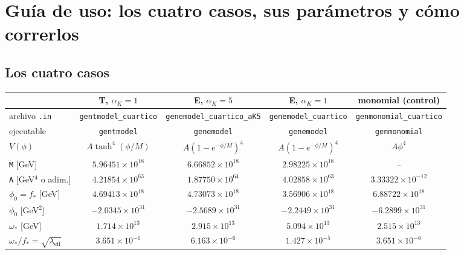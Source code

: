 \documentclass[11pt]{article}
\begin{document}
    \section{Guía de uso: los cuatro casos, sus parámetros y cómo correrlos}
        \label{sec:guia}

        \subsection{Los cuatro casos}

            \begin{table}[H]
                \centering
                \footnotesize
                \setlength{\tabcolsep}{3pt}
                \begin{tabular}{lcccc}
                    \toprule
                    & T, $\alpha_K = 1$ & E, $\alpha_K = 5$ & E, $\alpha_K = 1$ & monomial (control) \\
                    \midrule
                    archivo \texttt{.in} & \texttt{gentmodel\_cuartico} & \texttt{genemodel\_cuartico\_aK5} & \texttt{genemodel\_cuartico} & \texttt{genmonomial\_cuartico} \\
                    ejecutable & \texttt{gentmodel} & \texttt{genemodel} & \texttt{genemodel} & \texttt{genmonomial} \\
                    $V(\phi)$ & $A\tanh^4(\phi/M)$ & $A(1-e^{-\phi/M})^4$ & $A(1-e^{-\phi/M})^4$ & $A\phi^4$ \\
                    \texttt{M} [GeV] & $5.96451 \times 10^{18}$ & $6.66852 \times 10^{18}$ & $2.98225 \times 10^{18}$ & -- \\
                    \texttt{A} [GeV$^4$ o adim.] & $4.21854 \times 10^{63}$ & $1.87750 \times 10^{64}$ & $4.02858 \times 10^{63}$ & $3.33322 \times 10^{-12}$ \\
                    $\phi_0 = f_*$ [GeV] & $4.69413 \times 10^{18}$ & $4.73073 \times 10^{18}$ & $3.56906 \times 10^{18}$ & $6.88722 \times 10^{18}$ \\
                    $\dot\phi_0$ [GeV$^2$] & $-2.0345 \times 10^{31}$ & $-2.5689 \times 10^{31}$ & $-2.2449 \times 10^{31}$ & $-6.2899 \times 10^{31}$ \\
                    $\omega_*$ [GeV] & $1.714 \times 10^{13}$ & $2.915 \times 10^{13}$ & $5.094 \times 10^{13}$ & $2.515 \times 10^{13}$ \\
                    $\omega_*/f_* = \sqrt{\lambda_{\text{eff}}}$ & $3.651 \times 10^{-6}$ & $6.163 \times 10^{-6}$ & $1.427 \times 10^{-5}$ & $3.651 \times 10^{-6}$ \\

\end{tabular}
\end{table}
\end{document}
